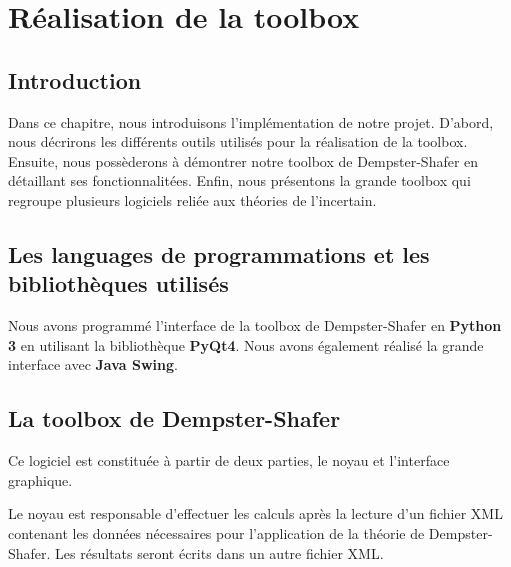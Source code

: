 \chapter{Réalisation de la toolbox}

\section{Introduction}

Dans ce chapitre, nous introduisons l'implémentation de notre projet. D'abord, nous 
décrirons les différents outils utilisés pour la réalisation de la toolbox. Ensuite,
nous possèderons à démontrer notre toolbox de Dempster-Shafer en détaillant ses
fonctionnalitées. Enfin, nous présentons la grande toolbox qui regroupe plusieurs
logiciels reliée aux théories de l'incertain.

\section{Les languages de programmations et les bibliothèques utilisés}

Nous avons programmé l'interface de la toolbox de Dempster-Shafer en \textbf{Python 3}
en utilisant la bibliothèque \textbf{PyQt4}. Nous avons également réalisé la grande
interface avec \textbf{Java Swing}.

\section{La toolbox de Dempster-Shafer}

Ce logiciel est constituée à partir de deux parties, le noyau et l'interface graphique.

Le noyau est responsable d'effectuer les calculs après la lecture d'un fichier XML
contenant les données nécessaires pour l'application de la théorie de Dempster-Shafer.
Les résultats seront écrits dans un autre fichier XML.
